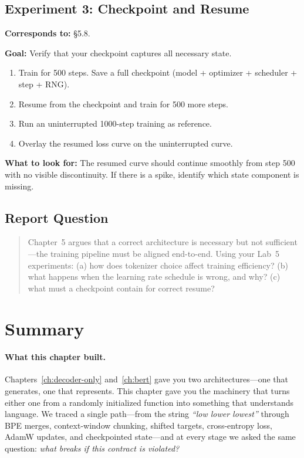 \subsection*{Experiment 3: Checkpoint and Resume}

\textbf{Corresponds to:} \S5.8.

\textbf{Goal:} Verify that your checkpoint captures all necessary state.

\begin{enumerate}[nosep]
    \item Train for 500 steps. Save a full checkpoint (model + optimizer + scheduler + step + RNG).
    \item Resume from the checkpoint and train for 500 more steps.
    \item Run an uninterrupted 1000-step training as reference.
    \item Overlay the resumed loss curve on the uninterrupted curve.
\end{enumerate}

\textbf{What to look for:} The resumed curve should continue smoothly from step 500 with no visible discontinuity. If there is a spike, identify which state component is missing.

\subsection*{Report Question}

\begin{quote}
Chapter~5 argues that a correct architecture is necessary but not sufficient---the training pipeline must be aligned end-to-end. Using your Lab~5 experiments: (a) how does tokenizer choice affect training efficiency? (b) what happens when the learning rate schedule is wrong, and why? (c) what must a checkpoint contain for correct resume?
\end{quote}


\section{Summary}

\paragraph{What this chapter built.} Chapters~\ref{ch:decoder-only} and~\ref{ch:bert} gave you two architectures---one that generates, one that represents. This chapter gave you the machinery that turns either one from a randomly initialized function into something that understands language. We traced a single path---from the string \emph{``low lower lowest''} through BPE merges, context-window chunking, shifted targets, cross-entropy loss, AdamW updates, and checkpointed state---and at every stage we asked the same question: \emph{what breaks if this contract is violated?}

